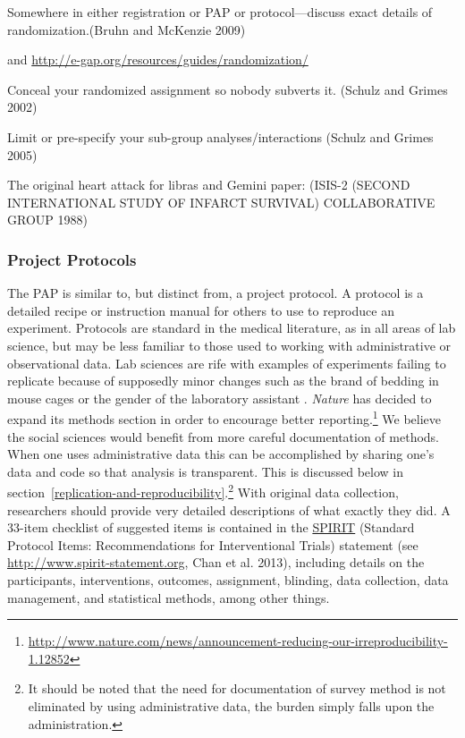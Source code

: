 \documentclass[12pt] {article}
\begin{document}
Somewhere in either registration or PAP or protocol---discuss exact
details of randomization.(Bruhn and McKenzie 2009)

and \url{http://e-gap.org/resources/guides/randomization/}

Conceal your randomized assignment so nobody subverts it. (Schulz and
Grimes 2002)

Limit or pre-specify your sub-group analyses/interactions (Schulz and
Grimes 2005)

The original heart attack for libras and Gemini paper: (ISIS-2 (SECOND
INTERNATIONAL STUDY OF INFARCT SURVIVAL) COLLABORATIVE GROUP 1988)


\subsubsection{Project Protocols}\label{project-protocols}

The PAP is similar to, but distinct from, a project protocol. A protocol is a detailed recipe or instruction
manual for others to use to reproduce an experiment. Protocols
are standard in the medical literature, as in all areas of lab science,
but may be less familiar to those used to working with administrative or
observational data. Lab sciences are rife with examples of experiments failing to replicate because of supposedly minor changes such as the brand of bedding in mouse cages or the gender of the laboratory assistant \citep{sorge2014olfactory}. \textit{Nature} has decided to expand its methods section in order to encourage better reporting.\footnote{\url{http://www.nature.com/news/announcement-reducing-our-irreproducibility-1.12852}}
We believe the social sciences would benefit from more careful documentation of methods. When one uses administrative data this can be accomplished by sharing one's data and code so that analysis is transparent. This is discussed below in section~\ref{replication-and-reproducibility}.\footnote{It should be noted that the need for documentation of survey method is not eliminated by using administrative data, the burden simply falls upon the administration.} With original data collection, researchers should provide very detailed descriptions of what exactly they did. A 33-item checklist of suggested items is contained in the \href{http://www.spirit-statement.org/}{SPIRIT} (Standard Protocol Items: Recommendations for Interventional
Trials) statement (see \url{http://www.spirit-statement.org}, Chan et al. 2013), including details on the participants, interventions, outcomes, assignment, blinding, data collection, data management, and statistical methods, among other things. 
\end{document}

